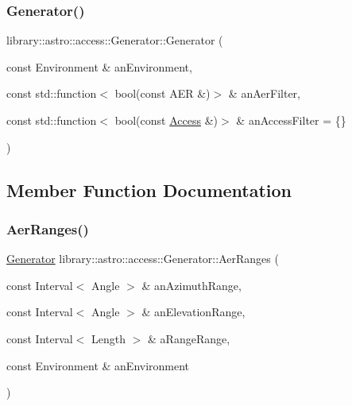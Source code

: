\subsubsection{\texorpdfstring{Generator()}{Generator()}\hspace{0.1cm}{\footnotesize\ttfamily [2/2]}}
{\footnotesize\ttfamily library\+::astro\+::access\+::\+Generator\+::\+Generator (\begin{DoxyParamCaption}\item[{const Environment \&}]{an\+Environment,  }\item[{const std\+::function$<$ bool(const A\+ER \&)$>$ \&}]{an\+Aer\+Filter,  }\item[{const std\+::function$<$ bool(const \hyperlink{classlibrary_1_1astro_1_1_access}{Access} \&)$>$ \&}]{an\+Access\+Filter = {\ttfamily \{\}} }\end{DoxyParamCaption})}



\subsection{Member Function Documentation}
\mbox{\label{classlibrary_1_1astro_1_1access_1_1_generator_a51e8191b002ee609db6ce11927281bba}} 
\subsubsection{\texorpdfstring{Aer\+Ranges()}{AerRanges()}}
{\footnotesize\ttfamily \hyperlink{classlibrary_1_1astro_1_1access_1_1_generator}{Generator} library\+::astro\+::access\+::\+Generator\+::\+Aer\+Ranges (\begin{DoxyParamCaption}\item[{const Interval$<$ Angle $>$ \&}]{an\+Azimuth\+Range,  }\item[{const Interval$<$ Angle $>$ \&}]{an\+Elevation\+Range,  }\item[{const Interval$<$ Length $>$ \&}]{a\+Range\+Range,  }\item[{const Environment \&}]{an\+Environment }\end{DoxyParamCaption})\hspace{0.3cm}{\ttfamily [static]}}

